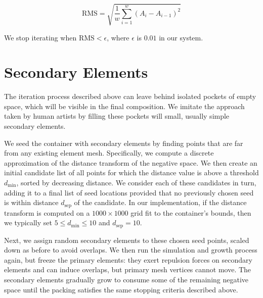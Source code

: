 \begin{equation}
\mathrm{RMS} = \sqrt{ \frac{1}{w}\sum_{ i = 1 }^{w} { (A_i - A_{i-1}) }^2}
\end{equation}

We stop iterating when $\mathrm{RMS} < \epsilon$, where $\epsilon$ is $0.01$
in our system.

\section{Secondary Elements}
\label{repulsionpak_secondary_elements}

The iteration process described above can leave behind isolated pockets of 
empty space, which will be visible in the final composition.  We imitate the
approach taken by human artists by filling these pockets will small, usually
simple secondary elements.  

We seed the container with secondary elements by finding points
that are far from any existing element mesh.  Specifically, we
compute a discrete approximation of the distance transform of the
negative space. We then create an initial candidate list of all
points for which the distance value is above a threshold $d_\mathrm{min}$, 
sorted by decreasing distance.  We consider each of these candidates in turn,
adding it to a final list of seed locations provided that no previously
chosen seed is within distance $d_\mathrm{sep}$ of the candidate.
In our implementation, if the distance transform is computed on a 
$1000\times 1000$ grid fit to the container's bounds, then we typically 
set $5 \leq d_\mathrm{min} \leq 10$ and $d_\mathrm{sep}=10$. 

Next, we assign random secondary elements to these chosen seed
points, scaled down as before to avoid overlaps.  We then run the
simulation and growth process again, but freeze the primary elements:
they exert repulsion forces on secondary elements and can induce
overlaps, but primary mesh vertices cannot move.  The secondary
elements gradually grow to consume some of the remaining negative
space until the packing satisfies the same stopping criteria
described above.



